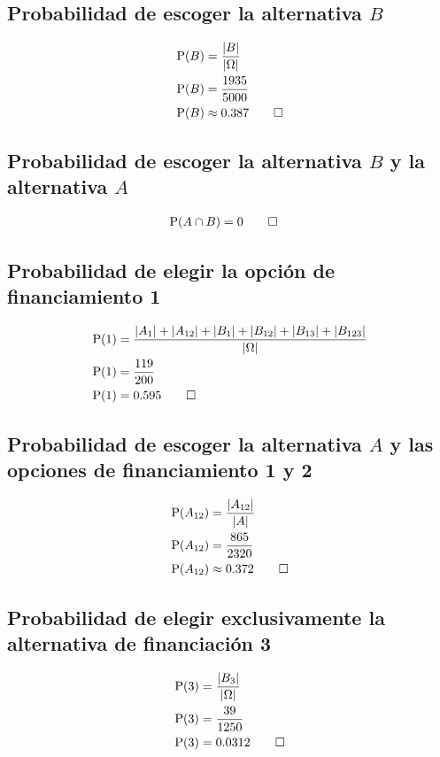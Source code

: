 \documentclass[paper=letterpaper]{article}
\begin{document}
\subsection{Probabilidad de escoger la alternativa $B$}
\begin{alignat}{4}
\text{P}(B) &= \frac{\vert B \vert}{\vert \Omega \vert} \\
\text{P}(B) &= \frac{1935}{5000} \\
\text{P}(B) &\approx 0.387 \qed
\end{alignat}

\subsection{Probabilidad de escoger la alternativa $B$ y la alternativa $A$}
\begin{alignat}{1}
\text{P}(A \cap B) &= 0 \qed 
\end{alignat}

\subsection{Probabilidad de elegir la opci\'{o}n de financiamiento 1}
\begin{alignat}{4}
\text{P}(1) &= \frac{\vert A_1 \vert + \vert A_{12} \vert + \vert B_1 \vert + \vert B_{12} \vert + \vert B_{13} \vert + \vert B_{123} \vert}{\vert \Omega \vert}  \\
\text{P}(1) &= \frac{119}{200} \\
\text{P}(1) &= 0.595 \qed
\end{alignat}

\subsection{Probabilidad de escoger la alternativa $A$ y las opciones de financiamiento 1 y 2}
\begin{alignat}{4}
\text{P}(A_{12}) &= \frac{\vert A_{12} \vert}{\vert A \vert} \\
\text{P}(A_{12}) &= \frac{865}{2320} \\
\text{P}(A_{12}) &\approx 0.372 \qed
\end{alignat}

\subsection{Probabilidad de elegir exclusivamente la alternativa de financiaci\'{o}n 3}
\begin{alignat}{2}
\text{P}(3) &= \frac{\vert B_{3} \vert}{\vert \Omega \vert} \\
\text{P}(3) &= \frac{39}{1250} \\
\text{P}(3) &= 0.0312 \qed
\end{alignat}
\end{document}
